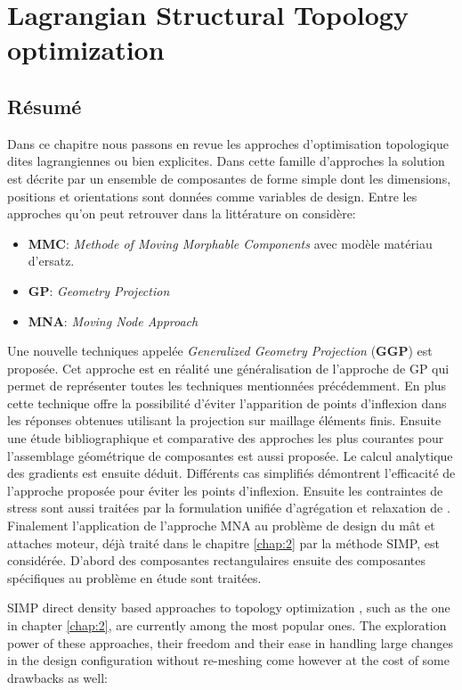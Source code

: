 \chapter{Lagrangian Structural Topology optimization}
\minitoc
\begin{mdframed}[hidealllines=true,backgroundcolor=lightgray!20]
\section*{Résumé}
Dans ce chapitre nous passons en revue les approches d'optimisation topologique dites lagrangiennes ou bien explicites. Dans cette famille d'approches la solution est décrite par un ensemble de composantes de forme simple dont les dimensions, positions et orientations sont données comme variables de design. Entre les approches qu'on peut retrouver dans la littérature on considère:
 \begin{itemize}
 \item \textbf{MMC}: \textit{Methode of Moving Morphable Components} avec modèle matériau d'ersatz.
 \item \textbf{GP}: \textit{Geometry Projection}
 \item \textbf{MNA}: \textit{Moving Node Approach}
 \end{itemize}
 Une nouvelle techniques appelée \textit{Generalized Geometry Projection} (\textbf{GGP}) \cite{coniglio2019generalized} est proposée. Cet approche est en réalité une généralisation de l'approche de GP qui permet de représenter toutes les techniques mentionnées précédemment. En plus cette technique offre la possibilité d'éviter l'apparition de points d'inflexion dans les réponses obtenues utilisant la projection sur maillage éléments finis. Ensuite une étude bibliographique et comparative des approches les plus courantes pour l'assemblage géométrique de composantes est aussi proposée. Le calcul analytique des gradients est ensuite déduit.
 Différents cas simplifiés démontrent l'efficacité de l'approche proposée pour éviter les points d'inflexion. 
 Ensuite les contraintes de stress sont aussi traitées par la formulation unifiée d'agrégation et relaxation de \cite{verbart2017unified}. Finalement l'application  de l'approche MNA au problème de design du mât et attaches moteur, déjà traité dans le chapitre \ref{chap:2} par la méthode SIMP, est considérée. D'abord des composantes rectangulaires ensuite des composantes  spécifiques au problème en étude sont traitées. 
\end{mdframed}
\label{chap:3}
    SIMP direct density based approaches to topology optimization \cite{bendsoe1989optimal,zhou1991coc,bendsoe1995optimization}, such as the one in chapter \ref{chap:2}, are currently among the most popular ones. The exploration power of these approaches, their freedom and their ease in handling large changes in the design configuration without re-meshing come however at the cost of some drawbacks as well:
